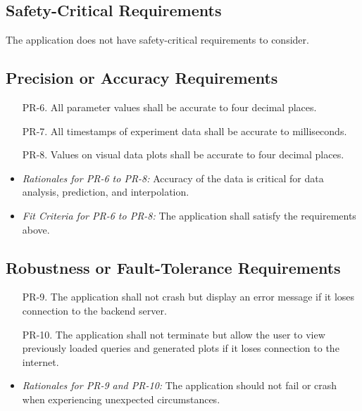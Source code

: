 \documentclass[12pt]{article}
\begin{document}
\subsection{Safety-Critical Requirements}
The application does not have safety-critical requirements to consider.

\subsection{Precision or Accuracy Requirements}
\begin{enumerate}
  \item[PR-6.] All parameter values shall be accurate to four decimal places.
  \item[PR-7.] All timestamps of experiment data shall be accurate to milliseconds. 
  \item[PR-8.] Values on visual data plots shall be accurate to four decimal places.
\end{enumerate}
\begin{itemize}
  \item \textit{Rationales for PR-6 to PR-8:} Accuracy of the data is critical for data analysis, prediction, and interpolation.
  \item \textit{Fit Criteria for PR-6 to PR-8:} The application shall satisfy the requirements above.
\end{itemize}

\subsection{Robustness or Fault-Tolerance Requirements}
\begin{enumerate}
  \item[PR-9.] The application shall not crash but display an error message if it loses connection to the backend server.
  \item[PR-10.] The application shall not terminate but allow the user to view previously loaded queries and generated plots if it loses connection to the internet.
\end{enumerate}
\begin{itemize}
  \item \textit{Rationales for PR-9 and PR-10:} The application should not fail or crash when experiencing unexpected circumstances.
\end{itemize}
\end{document}
